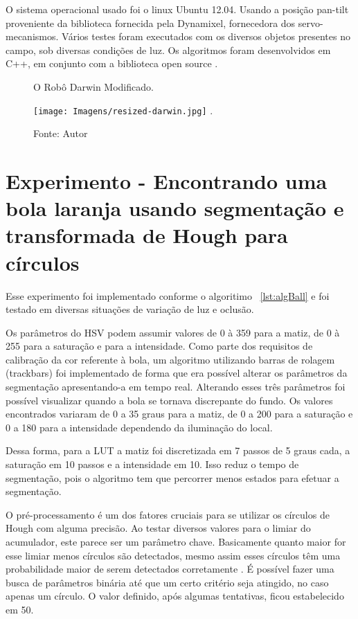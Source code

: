 O sistema operacional usado foi o linux Ubuntu 12.04. Usando a posição pan-tilt proveniente da biblioteca fornecida pela Dynamixel, fornecedora dos servo-mecanismos. Vários testes foram executados com os diversos objetos presentes no campo, sob diversas condições de luz. Os algoritmos foram desenvolvidos em C++, em conjunto com a biblioteca open source .

\begin{figure}[!t]
\centering \caption{O Robô Darwin Modificado.}
\texttt{[image: Imagens/resized-darwin.jpg]}
\DeclareGraphicsExtensions.
\caption*{Fonte: Autor}
\label{Fig:Darwin}
\end{figure}


\section{Experimento - Encontrando uma bola laranja usando segmentação e transformada de Hough para círculos}
\label{exp:bollar}
Esse experimento foi implementado conforme o algoritimo ~\ref{lst:algBall} e foi testado em diversas situações de variação de luz e oclusão.

Os parâmetros do HSV podem assumir valores de 0 à 359 para a matiz, de 0 à 255 para a saturação e para a intensidade. Como parte dos requisitos de calibração da cor referente à bola, um algoritmo utilizando barras de rolagem (trackbars) foi implementado de forma que era possível alterar os parâmetros da segmentação apresentando-a em tempo real. Alterando esses três parâmetros foi possível visualizar quando a bola se tornava discrepante do fundo. Os valores encontrados variaram de 0 a 35 graus para a matiz, de 0 a 200 para a saturação e 0 a 180 para a intensidade dependendo da iluminação do local.

Dessa forma, para a LUT a matiz foi discretizada em 7 passos de 5 graus cada, a saturação em 10 passos e a intensidade em 10. Isso reduz o tempo de segmentação, pois o algoritmo tem que percorrer menos estados para efetuar a segmentação.

O pré-processamento é um dos fatores cruciais para se utilizar os círculos de Hough com alguma precisão. Ao testar diversos valores para o limiar do acumulador, este parece ser um parâmetro chave. Basicamente quanto maior for esse limiar menos círculos são detectados, mesmo assim esses círculos têm uma probabilidade maior de serem detectados corretamente \cite{Davies}. É possível fazer uma busca de parâmetros binária até que um certo critério seja atingido, no caso apenas um círculo. O valor definido, após algumas tentativas, ficou estabelecido em 50. 


